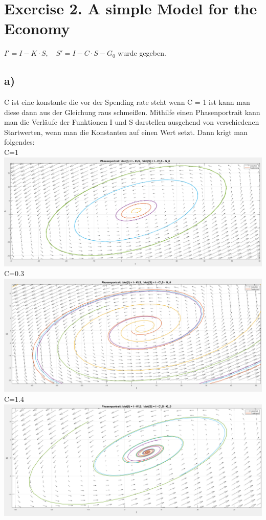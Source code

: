 \documentclass{scrartcl}
\begin{document}
\section*{Exercise 2. A simple Model for the Economy}
$I'=I-K\cdot S ,\quad S'=I-C\cdot S- G_0$ wurde gegeben.\\
\subsection*{a)}
C ist eine konstante die vor der Spending rate steht wenn C = 1 ist kann man diese dann aus der Gleichung raus schmeißen. Mithilfe einen Phasenportrait kann man die Verläufe der Funktionen I und S darstellen ausgehend von verschiedenen Startwerten, wenn man die Konstanten auf einen Wert setzt. Dann krigt man folgendes:\\
C=1\\
\includegraphics[scale=0.3]{PhasenportraitC1.png}\\
C=0.3\\
\includegraphics[scale=0.3]{PhasenportraitC04.png}\\
C=1.4\\
\includegraphics[scale=0.3]{PhasenportraitC2.png}
\end{document}
